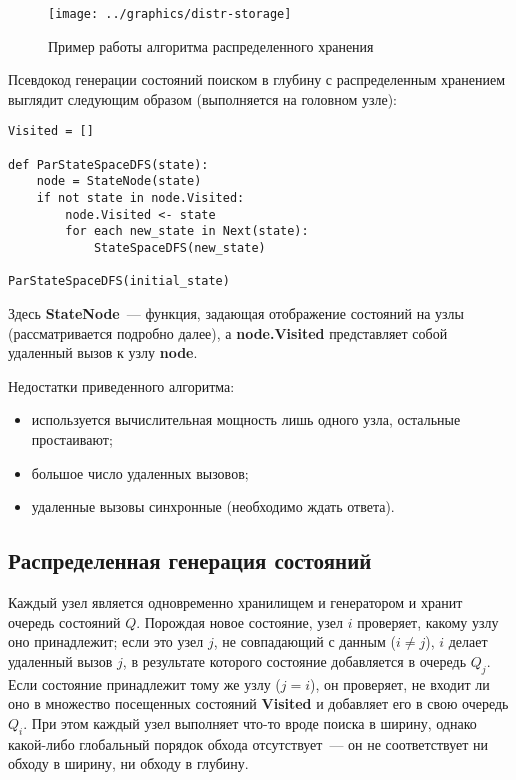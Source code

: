 \documentclass[12pt,a4paper,fleqn]{article}
\newcommand{\Code}[1]{\textbf{\mbox{#1}}}
\begin{document}
\begin{figure}[!htb]
  \centering 
  \texttt{[image: ../graphics/distr-storage]}
  \caption{Пример работы алгоритма распределенного хранения}
  \label{fig:distr-storage}
\end{figure}

Псевдокод генерации состояний поиском в глубину с распределенным хранением выглядит
следующим образом (выполняется на головном узле):

\begin{lstlisting}[style=pseudocode]
Visited = []

def ParStateSpaceDFS(state):
    node = StateNode(state)
    if not state in node.Visited:
        node.Visited <- state
        for each new_state in Next(state):
            StateSpaceDFS(new_state)

ParStateSpaceDFS(initial_state)
\end{lstlisting}

Здесь \Code{StateNode}~--- функция, задающая отображение состояний на узлы (рассматривается
подробно далее), а \Code{node.Visited} представляет собой удаленный вызов к узлу
\Code{node}.

Недостатки приведенного алгоритма:
\begin{itemize}
\item используется вычислительная мощность лишь одного узла, остальные простаивают;
\item большое число удаленных вызовов;
\item удаленные вызовы синхронные (необходимо ждать ответа).
\end{itemize}

\subsection{Распределенная генерация состояний}
\label{sec:distr-generation}

Каждый узел является одновременно хранилищем и генератором и хранит очередь состояний
$Q$. Порождая новое состояние, узел $i$ проверяет, какому узлу оно принадлежит; если это
узел $j$, не совпадающий с данным ($i \neq j$), $i$ делает удаленный вызов $j$, в
результате которого состояние добавляется в очередь $Q_j$. Если состояние принадлежит тому
же узлу ($j = i$), он проверяет, не входит ли оно в множество посещенных состояний
\Code{Visited} и добавляет его в свою очередь $Q_i$. При этом каждый узел выполняет что-то
вроде поиска в ширину, однако какой-либо глобальный порядок обхода отсутствует~--- он не
соответствует ни обходу в ширину, ни обходу в глубину.
\end{document}
